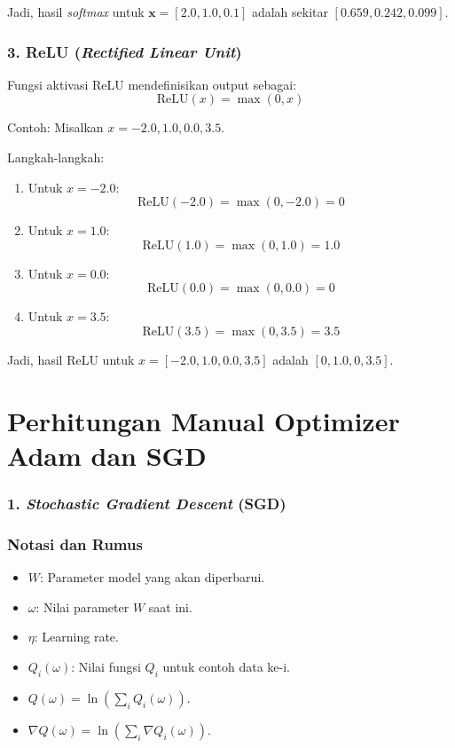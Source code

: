 Jadi, hasil \textit{softmax} untuk \(\mathbf{x} = [2.0, 1.0, 0.1]\) adalah sekitar \([0.659, 0.242, 0.099]\).

\subsection*{3. ReLU (\textit{Rectified Linear Unit})}
Fungsi aktivasi ReLU mendefinisikan output sebagai:
\[
\text{ReLU}(x) = \max(0, x)
\]

Contoh: Misalkan \( x = -2.0, 1.0, 0.0, 3.5 \).

Langkah-langkah:
\begin{enumerate}
    \item Untuk \( x = -2.0 \):
    \[
    \text{ReLU}(-2.0) = \max(0, -2.0) = 0
    \]

    \item Untuk \( x = 1.0 \):
    \[
    \text{ReLU}(1.0) = \max(0, 1.0) = 1.0
    \]

    \item Untuk \( x = 0.0 \):
    \[
    \text{ReLU}(0.0) = \max(0, 0.0) = 0
    \]

    \item Untuk \( x = 3.5 \):
    \[
    \text{ReLU}(3.5) = \max(0, 3.5) = 3.5
    \]
\end{enumerate}

Jadi, hasil ReLU untuk \( x = [-2.0, 1.0, 0.0, 3.5] \) adalah \([0, 1.0, 0, 3.5]\).



\chapter{Perhitungan Manual Optimizer Adam dan SGD}

\subsection*{1. \textit{Stochastic Gradient Descent} (SGD)}


\subsection*{Notasi dan Rumus}
\begin{itemize}
    \item \( W \): Parameter model yang akan diperbarui.
    \item \( \omega \): Nilai parameter \( W \) saat ini.
    \item \( \eta \): Learning rate.
    \item \( Q_i(\omega) \): Nilai fungsi \( Q_i \) untuk contoh data ke-i.
    \item \( Q(\omega) = \ln\left(\sum_i Q_i(\omega)\right) \).
    \item \( \nabla Q(\omega) = \ln\left(\sum_i \nabla Q_i(\omega)\right) \).
\end{itemize}

